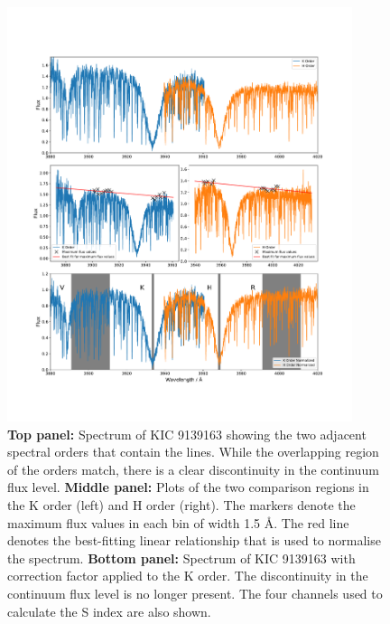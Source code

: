 \begin{figure}
    \centering
    \includegraphics[width=0.9\textwidth]{Figures/4-Chromospheric_age/kic9139163_example.pdf}
    \caption[Example of optical spectra in \caII region and the normalisation method]{\textbf{Top panel:} Spectrum of KIC 9139163 showing the two adjacent spectral orders that contain the \caII lines. While the overlapping region of the orders match, there is a clear discontinuity in the continuum flux level.
    \textbf{Middle panel:} Plots of the two comparison regions in the K order (left) and H order (right). The markers denote the maximum flux values in each bin of width 1.5 \AA. The red line denotes the best-fitting linear relationship that is used to normalise the spectrum.
    \textbf{Bottom panel:} Spectrum of KIC 9139163 with correction factor applied to the K order. The discontinuity in the continuum flux level is no longer present. The four channels used to calculate the S index are also shown.}
    \label{fig:normlisation_example}
\end{figure}

